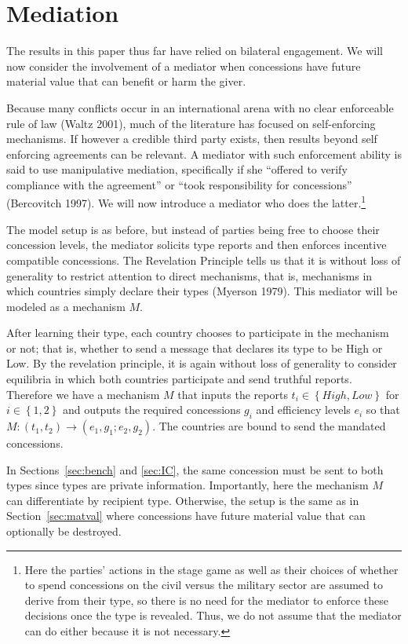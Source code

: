 \documentclass[12pt, letterpaper]{article}
\begin{document}
\section{Mediation}
\label{sec:med}
The results in this paper thus far have relied on bilateral engagement. We will now consider the involvement of a mediator when concessions have future material value that can benefit or harm the giver. 

Because many conflicts occur in an international arena with no clear enforceable rule of law (Waltz 2001), much of the literature has focused on self-enforcing mechanisms. If however a credible third party exists, then results beyond self enforcing agreements can be relevant.  A mediator with such enforcement ability is said to use manipulative mediation, specifically if she ``offered to verify compliance with the agreement''  or ``took responsibility for concessions''  (Bercovitch 1997). We will now introduce a mediator who does the latter.\footnote{Here the parties' actions in the stage game as well as their choices of whether to spend concessions on the civil versus the military sector are assumed to derive from their type, so there is no need for the mediator to enforce these decisions once the type is revealed. Thus, we do not assume that the mediator can do either because it is not necessary.} 

The model setup is as before, but instead of parties being free to choose their concession levels, the mediator solicits type reports and then enforces incentive compatible concessions. The Revelation Principle tells us that it is without loss of generality to restrict attention to direct mechanisms, that is, mechanisms in which countries simply declare their types (Myerson 1979). This mediator will be modeled as a mechanism $M$.

After learning their type, each country chooses to participate in the mechanism or not; that is, whether to send a message that declares its type to be High or Low. By the revelation principle, it is again without loss of generality to consider equilibria in which both countries participate and send truthful reports. Therefore we have a mechanism $M$ that inputs the reports $t_i \in \left\{High,Low\right\}$ for $i \in \left\{1,2\right\}$ and outputs the required concessions $g_i$ and efficiency levels $e_i$ so that $ M:(t_1,t_2)\rightarrow( e_1, g_1; e_2,g_2)$. The countries are bound to send the mandated concessions.

In Sections~\ref{sec:bench} and \ref{sec:IC}, the same concession must be sent to both types since types are private information. Importantly, here the mechanism $M$ can differentiate by recipient type. Otherwise, the setup is the same as in Section~\ref{sec:matval} where concessions have future material value that can optionally be destroyed.
\end{document}
